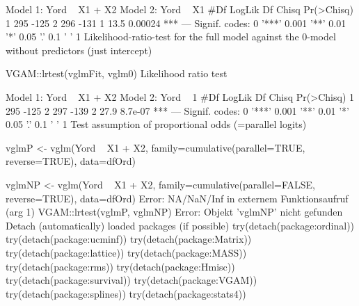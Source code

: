 Model 1: Yord ~ X1 + X2
Model 2: Yord ~ X1
  #Df LogLik Df Chisq Pr(>Chisq)    
1 295   -125                        
2 296   -131  1  13.5    0.00024 ***
---
Signif. codes:  0 '***' 0.001 '**' 0.01 '*' 0.05 '.' 0.1 ' ' 1 
Likelihood-ratio-test for the full model against the 0-model without predictors (just intercept)

VGAM::lrtest(vglmFit, vglm0)
Likelihood ratio test

Model 1: Yord ~ X1 + X2
Model 2: Yord ~ 1
  #Df LogLik Df Chisq Pr(>Chisq)    
1 295   -125                        
2 297   -139  2  27.9    8.7e-07 ***
---
Signif. codes:  0 '***' 0.001 '**' 0.01 '*' 0.05 '.' 0.1 ' ' 1 
Test assumption of proportional odds (=parallel logits)

vglmP <- vglm(Yord ~ X1 + X2, family=cumulative(parallel=TRUE,  reverse=TRUE),
              data=dfOrd)

vglmNP <- vglm(Yord ~ X1 + X2, family=cumulative(parallel=FALSE, reverse=TRUE),
                data=dfOrd)
Error: NA/NaN/Inf in externem Funktionsaufruf (arg 1)
VGAM::lrtest(vglmP, vglmNP)
Error: Objekt 'vglmNP' nicht gefunden
Detach (automatically) loaded packages (if possible)
try(detach(package:ordinal))
try(detach(package:ucminf))
try(detach(package:Matrix))
try(detach(package:lattice))
try(detach(package:MASS))
try(detach(package:rms))
try(detach(package:Hmisc))
try(detach(package:survival))
try(detach(package:VGAM))
try(detach(package:splines))
try(detach(package:stats4))
